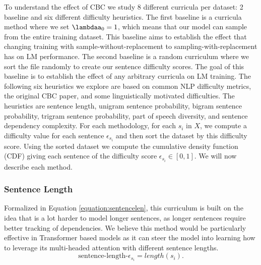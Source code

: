 To understand the effect of CBC we study 8 different curricula per dataset: 2 baseline and six different difficulty heuristics. The first baseline is a curricula method where we set $\lambdaa_0 = 1$, which means that our model can sample from the entire training dataset. This baseline aims to establish the effect that changing training with sample-without-replacement to sampling-with-replacement has on LM performance. The second baseline is a random curriculum where we sort the file randomly to create our sentence difficulty scores. The goal of this baseline is to establish the effect of any arbitrary curricula on LM training. The following six heuristics we explore are based on common NLP difficulty metrics, the original CBC paper, and some linguistically motivated difficulties. The heuristics are sentence length, unigram sentence probability, bigram sentence probability, trigram sentence probability, part of speech diversity, and sentence dependency complexity. For each methodology, for each $s_i$ in $X$, we compute a difficulty value for each sentence $\epsilon_{s_i}$ and then sort the dataset by this difficulty score. Using the sorted dataset we compute the cumulative density function (CDF) giving each sentence of the difficulty score $\epsilon_{s_i} \in [0,1]$. We will now describe each method.
\subsubsection{Sentence Length}
Formalized in Equation \ref{equation:sentencelen}, this curriculum is built on the idea that is a lot harder to model longer sentences, as longer sentences require better tracking of dependencies. We believe this method would be particularly effective in Transformer based models as it can steer the model into learning how to leverage its multi-headed attention with different sentence lengths. \begin{equation}
    \text{sentence-length-}\epsilon_{s_i} = length(s_i).
    \label{equation:sentencelen}
\end{equation} 

